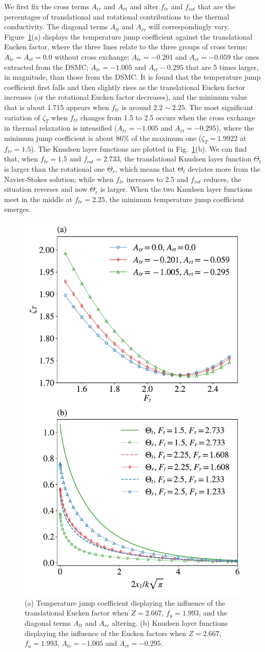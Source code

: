 We first fix the cross terms $A_{tr}$ and $A_{rt}$ and alter $f_{tr}$ and $f_{rot}$ that are the percentages of translational and rotational contributions to the thermal conductivity. The diagonal terms $A_{tt}$ and $A_{rr}$ will correspondingly vary. Figure~\ref{fig:KLF_Ft}(a) displays the temperature jump coefficient against the translational Eucken factor, where the three lines relate to the three groups of cross terms: $A_{tr}=A_{rt}=0.0$ without cross exchange; $A_{tr}=-0.201$ and $A_{rt}=-0.059$ the ones extracted from the DSMC; $A_{tr}=-1.005$ and $A_{rt}-0.295$ that are 5 times larger, in magnitude, than those from the DSMC. It is found that the temperature jump coefficient first falls and then slightly rises as the translational Eucken factor increases (or the rotational Eucken factor decreases), and the minimum value that is about 1.715 appears when $f_{tr}$ is around $2.2\sim2.25$. The most significant variation of $\zeta_T$ when $f_{tr}$ changes from 1.5 to 2.5 occurs when the cross exchange in thermal relaxation is intensified ($A_{tr}=-1.005$ and $A_{rt}=-0.295$), where the minimum jump coefficient is about 86\% of the maximum one ($\zeta_T=1.9922$ at $f_{tr}=1.5$). The Knudsen layer functions are plotted in Fig.~\ref{fig:KLF_Ft}(b). We can find that, when $f_{tr}=1.5$ and $f_{rot}=2.733$, the translational Knudsen layer function $\Theta_t$ is larger than the rotational one $\Theta_r$, which means that $\Theta_t$ deviates more from the Navier-Stokes solution; while when $f_{tr}$ increases to 2.5 and $f_{rot}$ reduces, the situation reverses and now $\Theta_r$ is larger. When the two Knudsen layer functions meet in the middle at $f_{tr}=2.25$, the minimum temperature jump coefficient emerges. 



\begin{figure}[t]
	\centering
	\includegraphics[width=0.4\columnwidth]{SlipJump/IMG/KLF_Ft}%
	\caption{(a) Temperature jump coefficient displaying the influence of the translational Eucken factor when $Z=2.667$, $f_{u}=1.993$, and the diagonal terms $A_{tt}$ and $A_{rr}$ altering. (b) Knudsen layer functions displaying the influence of the Eucken factors when $Z=2.667$, $f_{u}=1.993$, $A_{tr}=-1.005$ and $A_{rt}=-0.295$.}
	\label{fig:KLF_Ft}
\end{figure}


